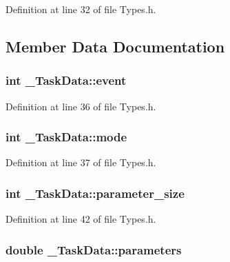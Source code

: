 Definition at line 32 of file Types.\+h.



\subsection{Member Data Documentation}
\hypertarget{struct___task_data_ae1f49893cada58856984c697da7ff4da}{}
\subsubsection[{event}]{\setlength{\rightskip}{0pt plus 5cm}int \+\_\+\+Task\+Data\+::event}\label{struct___task_data_ae1f49893cada58856984c697da7ff4da}


Definition at line 36 of file Types.\+h.

\hypertarget{struct___task_data_a59a493e22491be546a2c4085525731f5}{}
\subsubsection[{mode}]{\setlength{\rightskip}{0pt plus 5cm}int \+\_\+\+Task\+Data\+::mode}\label{struct___task_data_a59a493e22491be546a2c4085525731f5}


Definition at line 37 of file Types.\+h.

\hypertarget{struct___task_data_a9c9353c4ab3af86ea6865ad8dff936b2}{}
\subsubsection[{parameter\+\_\+size}]{\setlength{\rightskip}{0pt plus 5cm}int \+\_\+\+Task\+Data\+::parameter\+\_\+size}\label{struct___task_data_a9c9353c4ab3af86ea6865ad8dff936b2}


Definition at line 42 of file Types.\+h.

\hypertarget{struct___task_data_a351f7ab8dbcf6fec356c0db2ded099da}{}
\subsubsection[{parameters}]{\setlength{\rightskip}{0pt plus 5cm}double \+\_\+\+Task\+Data\+::parameters}\label{struct___task_data_a351f7ab8dbcf6fec356c0db2ded099da}


